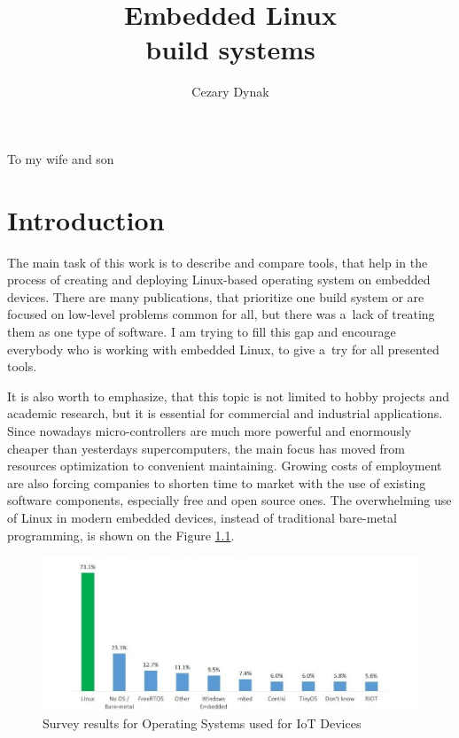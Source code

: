 \documentclass[printmode]{mgr}
\title{Embedded Linux \\ build systems}
\author{Cezary Dynak}
\begin{document}
%


\maketitle
\dedication{6cm}{To my wife and son}

\tableofcontents




















\chapter{Introduction}

The main task of this work is to describe and compare tools, that help in the process of creating and deploying Linux-based operating system on embedded devices.
There are many publications, that prioritize one build system or are focused on low-level problems common for all, but there was a~lack of treating them as one type of software.
I am trying to fill this gap and encourage everybody who is working with embedded Linux, to give a~try for all presented tools.

It is also worth to emphasize, that this topic is not limited to hobby projects and academic research, but it is essential for commercial and industrial applications.
Since nowadays micro-controllers are much more powerful and enormously cheaper than yesterdays supercomputers, the main focus has moved from resources optimization to convenient maintaining.
Growing costs of employment are also forcing companies to shorten time to market with the use of existing software components, especially free and open source ones.
The overwhelming use of Linux in modern embedded devices, instead of traditional bare-metal programming, is shown on the Figure \ref{fig:iot-os}.

\begin{figure}[htbp]
  \centering
    \includegraphics[width=\textwidth]{iot-os.jpg}
    \caption{Survey results for Operating Systems used for IoT Devices \cite{web:iot-os}}
  \label{fig:iot-os}
\end{figure}
\end{document}
